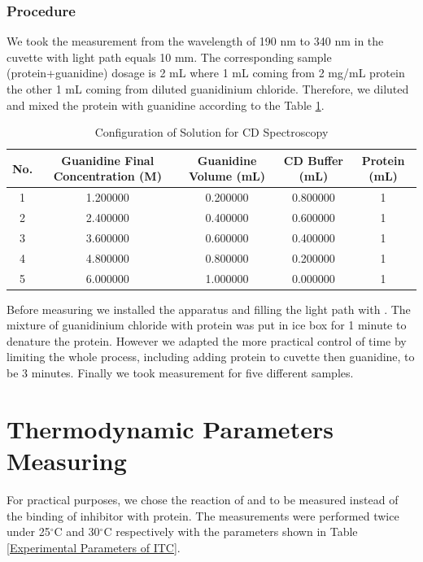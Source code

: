 \documentclass{report}
\begin{document}
\subsubsection{Procedure}
We took the measurement from the wavelength of 190 nm to 340 nm in the cuvette with light path equals 10 mm.
The corresponding sample (protein+guanidine) dosage is 2 mL where 1 mL coming from 2 mg/mL protein the other 1 mL coming from diluted guanidinium chloride.
Therefore, we diluted and mixed the protein with guanidine according to the Table \ref{Configuration of Solution for CD Spectroscopy}.
\begin{table}
    \centering
    \caption{Configuration of Solution for CD Spectroscopy}
    \label{Configuration of Solution for CD Spectroscopy}
    \begin{tabular}{|c|c|c|c|c|}
        \toprule
        No. & Guanidine Final Concentration (M) & Guanidine Volume (mL) & CD Buffer (mL) & Protein (mL) \\
        \midrule
        1 & 1.200000 & 0.200000 & 0.800000 & 1 \\
        2 & 2.400000 & 0.400000 & 0.600000 & 1 \\
        3 & 3.600000 & 0.600000 & 0.400000 & 1 \\
        4 & 4.800000 & 0.800000 & 0.200000 & 1 \\
        5 & 6.000000 & 1.000000 & 0.000000 & 1 \\
        \bottomrule
    \end{tabular}
\end{table}

Before measuring we installed the apparatus and filling the light path with .
The mixture of guanidinium chloride with protein was put in ice box for 1 minute to denature the protein.
However we adapted the more practical control of time by limiting the whole process, including adding protein to cuvette then guanidine, to be 3 minutes.
Finally we took measurement for five different samples.

\section{Thermodynamic Parameters Measuring}
For practical purposes, we chose the reaction of  and  to be measured instead of the binding of inhibitor with protein.
The measurements were performed twice under 25$^\circ$C and 30$^\circ$C respectively with the parameters shown in Table \ref{Experimental Parameters of ITC}.
\end{document}
